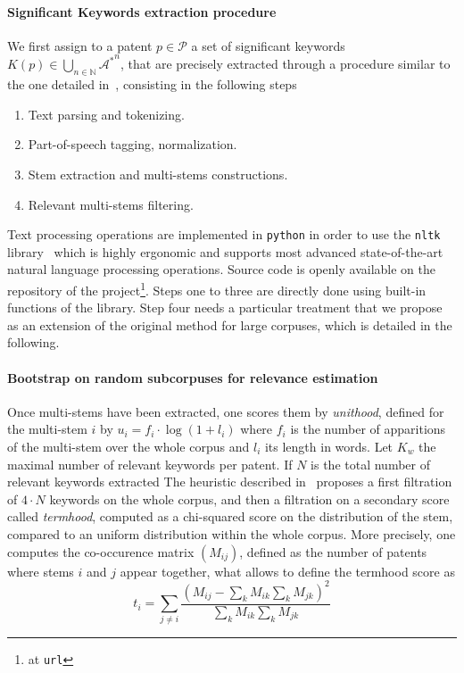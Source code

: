 \paragraph{Significant Keywords extraction procedure}

We first assign to a patent $p \in \mathcal{P}$ a set of significant keywords $K(p)\in \bigcup_{n\in \mathbb{N}} {\mathcal{A}^{\ast}}^n$, that are precisely extracted through a procedure similar to the one detailed in~\cite{chavalarias2013phylomemetic}, consisting in the following steps
\begin{enumerate}
\item Text parsing and tokenizing.
\item Part-of-speech tagging, normalization.
\item Stem extraction and multi-stems constructions.
\item Relevant multi-stems filtering.
\end{enumerate}

Text processing operations are implemented in \texttt{python} in order to use the \texttt{nltk} library~\cite{} %
which is highly ergonomic and supports most advanced state-of-the-art natural language processing operations. Source code is openly available on the repository of the project\footnote{at \texttt{url}}.
Steps one to three are directly done using built-in functions of the library. Step four needs a particular treatment that we propose as an extension of the original method for large corpuses, which is detailed in the following.

\paragraph{Bootstrap on random subcorpuses for relevance estimation}

Once multi-stems have been extracted, one scores them by \emph{unithood}, defined for the multi-stem $i$ by $u_i = f_i\cdot \log{(1 + l_i)}$ where $f_i$ is the number of apparitions of the multi-stem over the whole corpus and $l_i$ its length in words. Let $K_w$ the maximal number of relevant keywords per patent. If $N$ is the total number of relevant keywords extracted 
The heuristic described in~\cite{chavalarias2013phylomemetic} proposes a first filtration of $4\cdot N$ keywords on the whole corpus, and then a filtration on a secondary score called \emph{termhood}, computed as a chi-squared score on the distribution of the stem, compared to an uniform distribution within the whole corpus. More precisely, one computes the co-occurence matrix $(M_{ij})$, defined as the number of patents where stems $i$ and $j$ appear together, what allows to define the termhood score as
\[
t_i = \sum_{j\neq i}\frac{\left( M_{ij} - \sum_{k}M_{ik} \sum_{k} M_{jk}\right)^2}{\sum_{k}M_{ik} \sum_{k} M_{jk}}
\]




